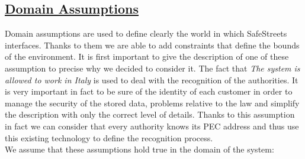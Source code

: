 \subsection[Domain Assumptions]{\hyperlink{toc}{Domain Assumptions}}
	\label{sec:domainAssumptions}
	Domain assumptions are used to define clearly the world in which SafeStreets interfaces. Thanks to them we are able to add constraints that define the bounds of the environment. It is first important to give the description of one of these assumption to precise why we decided to consider it. The fact that \emph{The system is allowed to work in Italy} is used to deal with the recognition of the authorities. It is very important in fact to be sure of the identity of each customer in order to manage the security of the stored data, problems relative to the law and simplify the description with only the correct level of details. Thanks to this assumption in fact we can consider that every authority knows its PEC address and thus use this existing technology to define the recognition process. \\
	
	We assume that these assumptions hold true in the domain of the system:
		
